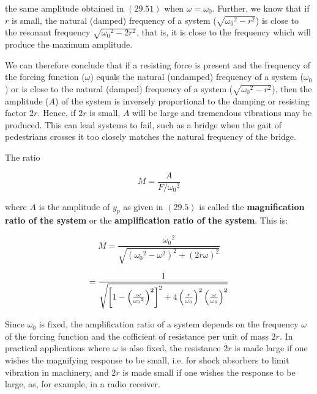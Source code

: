 \documentclass{article}
\begin{document}
the same amplitude obtained in $(29.51)$ when $\omega = \omega_0$. Further, we know that if $r$ is small, the natural (damped) frequency of a system ($\sqrt{ {\omega_0}^2 - r^2}$) is close to the resonant frequency $\sqrt{ {\omega_0}^2 - 2r^2}$, that is, it is close to the frequency which will produce the maximum amplitude.

We can therefore conclude that if a resisting force is present and the frequency of the forcing function ($\omega$) equals the natural (undamped) frequency of a system ($\omega_0$) or is close to the natural (damped) frequency of a system ($\sqrt{ {\omega_0}^2 - r^2}$), then the amplitude ($A$) of the system is inversely proportional to the damping or resisting factor $2r$. Hence, if $2r$ is small, $A$ will be large and tremendous vibrations may be produced. This can lead systems to fail, such as a bridge when the gait of pedestrians crosses it too closely matches the natural frequency of the bridge.

The ratio

\[ \tag{29.54} M = \frac{A}{F/{\omega_0}^2} \]

where $A$ is the amplitude of $y_p$ as given in $(29.5)$ is called the \textbf{magnification ratio of the system} or the \textbf{amplification ratio of the system}. This is:

\[ \tag{29.55} M = \frac{ {\omega_0}^2}{\sqrt{({\omega_0}^2 - \omega^2)^2 + (2r\omega)^2}} \]

\[ = \frac{1}{\sqrt{\left[1 - \left(\frac{\omega}{ {\omega_0}^2 }\right)^2\right]^2  + 4 \left(\frac{r}{\omega_0}\right)^2 \left(\frac{\omega}{\omega_0}\right)^2 }} \]

Since $\omega_0$ is fixed, the amplification ratio of a system depends on the frequency $\omega$ of the forcing function and the cofficient of resistance per unit of mass $2r$. In practical applications where $\omega$ is also fixed, the resistance $2r$ is made large if one wishes the magnifying response to be small, i.e. for shock absorbers to limit vibration in machinery, and $2r$ is made small if one wishes the response to be large, as, for example, in a radio receiver.
\end{document}
